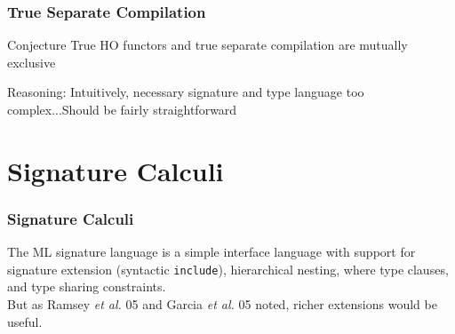 \documentclass{beamer}
\begin{document}
\begin{frame}
\frametitle{True Separate Compilation}
\begin{block}{Conjecture}
True HO functors and true separate compilation are mutually exclusive
\end{block}
\vspace{1cm}
Reasoning: Intuitively, necessary signature and type language too complex...Should be fairly straightforward
% 
\end{frame}

\section{Signature Calculi}

\begin{frame}[fragile]
\frametitle{Signature Calculi}

The ML signature language is a simple interface language with support for signature extension (syntactic \lstinline{include}), hierarchical nesting, where type clauses, and type sharing constraints.\\[1cm]

But as Ramsey {\it et al.} 05 and Garcia {\it et al.} 05 noted, richer extensions would be useful. 
\end{frame}
\end{document}
